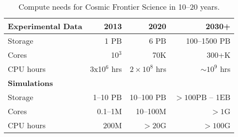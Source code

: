 \begin{center}
\begin{table}
\begin{tabular}{|l|r|r|r|} 
 \hline 
{\bf Experimental Data} & 2013 & 2020 & 2030+ \\
\hline
Storage & 1 PB & 6 PB & 100--1500 PB \\
Cores & 10$^3$ & 70K & 300+K \\
CPU hours & 3x10$^6$ hrs & $2\times 10^8$ hrs & $\sim 10^9$ hrs \\
{\bf Simulations} &&& \\
Storage & 1--10 PB & 10--100 PB & $> 100 $PB -- 1EB\\
Cores & 0.1--1M & 10--100M &$> 1$G\\
CPU hours & 200M & $>$20G & $> 100$G\\
\hline
\end{tabular}
\label{tab:CompNeeds}
\caption{Compute needs for Cosmic Frontier Science in 10--20 years.}
\end{table}
\end{center}

